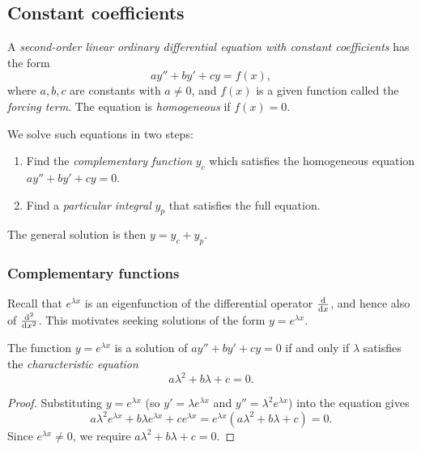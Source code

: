 \documentclass[a4paper]{article}
\begin{document}
\subsection{Constant coefficients}
\begin{defi}
  A \emph{second-order linear ordinary differential equation with constant coefficients} has the form
  \[
    ay'' + by' + cy = f(x),
  \]
  where $a, b, c$ are constants with $a \neq 0$, and $f(x)$ is a given function called the \emph{forcing term}. The equation is \emph{homogeneous} if $f(x) = 0$.
\end{defi}

\begin{remark}
  We solve such equations in two steps:
  \begin{enumerate}
    \item Find the \emph{complementary function} $y_c$ which satisfies the homogeneous equation $ay'' + by' + cy = 0$.
    \item Find a \emph{particular integral} $y_p$ that satisfies the full equation.
  \end{enumerate}
  The general solution is then $y = y_c + y_p$.
\end{remark}
\subsubsection{Complementary functions}
\begin{remark}
  Recall that $e^{\lambda x}$ is an eigenfunction of the differential operator $\frac{\mathrm{d}}{\mathrm{d} x}$, and hence also of $\frac{\mathrm{d}^2}{\mathrm{d} x^2}$. This motivates seeking solutions of the form $y = e^{\lambda x}$.
\end{remark}

\begin{prop}
  The function $y = e^{\lambda x}$ is a solution of $ay'' + by' + cy = 0$ if and only if $\lambda$ satisfies the \emph{characteristic equation}
  \[
    a\lambda^2 + b\lambda + c = 0.
  \]
\end{prop}
\begin{proof}
  Substituting $y = e^{\lambda x}$ (so $y' = \lambda e^{\lambda x}$ and $y'' = \lambda^2 e^{\lambda x}$) into the equation gives
  \[
    a\lambda^2 e^{\lambda x} + b\lambda e^{\lambda x} + c e^{\lambda x} = e^{\lambda x}(a\lambda^2 + b\lambda + c) = 0.
  \]
  Since $e^{\lambda x} \neq 0$, we require $a\lambda^2 + b\lambda + c = 0$.
\end{proof}
\end{document}
